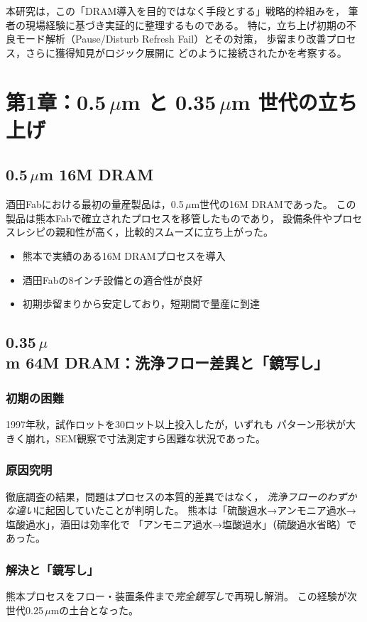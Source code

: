 \documentclass[conference]{IEEEtran}
\begin{document}
本研究は，この「DRAM導入を目的ではなく手段とする」戦略的枠組みを，
筆者の現場経験に基づき実証的に整理するものである。
特に，立ち上げ初期の不良モード解析（Pause/Disturb Refresh Fail）とその対策，
歩留まり改善プロセス，さらに獲得知見がロジック展開に
どのように接続されたかを考察する。

\section{第1章：0.5\,\texorpdfstring{$\mu$m}{μm} と 0.35\,\texorpdfstring{$\mu$m}{μm} 世代の立ち上げ}

\subsection{0.5\,$\mu$m 16M DRAM}
酒田Fabにおける最初の量産製品は，0.5\,$\mu$m世代の16M DRAMであった。
この製品は熊本Fabで確立されたプロセスを移管したものであり，
設備条件やプロセスレシピの親和性が高く，比較的スムーズに立ち上がった。
\begin{itemize}
  \item 熊本で実績のある16M DRAMプロセスを導入
  \item 酒田Fabの8インチ設備との適合性が良好
  \item 初期歩留まりから安定しており，短期間で量産に到達
\end{itemize}

\subsection{0.35\,$\mu$m 64M DRAM：洗浄フロー差異と「鏡写し」}
\subsubsection{初期の困難}
1997年秋，試作ロットを30ロット以上投入したが，いずれも
パターン形状が大きく崩れ，SEM観察で寸法測定すら困難な状況であった。

\subsubsection{原因究明}
徹底調査の結果，問題はプロセスの本質的差異ではなく，
\emph{洗浄フローのわずかな違い}に起因していたことが判明した。
熊本は「硫酸過水→アンモニア過水→塩酸過水」，酒田は効率化で
「アンモニア過水→塩酸過水」（硫酸過水省略）であった。

\subsubsection{解決と「鏡写し」}
熊本プロセスをフロー・装置条件まで\emph{完全鏡写し}で再現し解消。
この経験が次世代0.25\,$\mu$mの土台となった。
\end{document}
